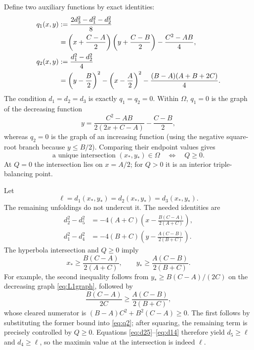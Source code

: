 \documentclass[11pt]{article}
\theoremstyle{definition}
\begin{document}
Define two auxiliary functions by exact identities:
\begin{align}
 q_1(x,y)&:=\frac{2d_3^2-d_1^2-d_2^2}{8}\notag\\
 &=\left(x+\frac{C-A}{2}\right)
   \left(y+\frac{C-B}{2}\right)-\frac{C^2-AB}{4},\label{eq:q1}\\
 q_2(x,y)&:=\frac{d_1^2-d_2^2}{4}\notag\\
 &=\left(y-\frac B2\right)^2-
   \left(x-\frac A2\right)^2-
   \frac{(B-A)(A+B+2C)}4.\label{eq:q2}
\end{align}
The condition $d_1=d_2=d_3$ is exactly $q_1=q_2=0$.
Within $\Omega$, $q_1=0$ is the graph of the decreasing function
\begin{equation}\label{eq:L1graph}
 y=\frac{C^2-AB}{2(2x+C-A)}-\frac{C-B}{2},
\end{equation}
whereas $q_2=0$ is the graph of an increasing function (using the negative
square-root branch because $y\le B/2$).  Comparing their endpoint values gives
\begin{equation}\label{eq:intersectionQ}
 \text{a unique intersection }(x_*,y_*)\in\Omega
 \quad\Longleftrightarrow\quad Q\ge0.
\end{equation}
At $Q=0$ the intersection lies on $x=A/2$; for $Q>0$ it is an interior
triple-balancing point.

Let
\begin{equation}
  \ell=d_1(x_*,y_*)=d_2(x_*,y_*)=d_3(x_*,y_*).
\end{equation}
The remaining unfoldings do not undercut it.  The needed identities are
\begin{align}
 d_2^2-d_5^2
 &=-4(A+C)\left(x-\frac{B(C-A)}{2(A+C)}\right),\label{eq:d25}\\
 d_1^2-d_4^2
 &=-4(B+C)\left(y-\frac{A(C-B)}{2(B+C)}\right).\label{eq:d14}
\end{align}
The hyperbola intersection and $Q\ge0$ imply
\begin{equation}\label{eq:xy-lower}
  x_*\ge\frac{B(C-A)}{2(A+C)},\qquad
  y_*\ge\frac{A(C-B)}{2(B+C)}.
\end{equation}
For example, the second inequality follows from
$y_*\ge B(C-A)/(2C)$ on the decreasing graph \eqref{eq:L1graph}, followed by
\[
  \frac{B(C-A)}{2C}\ge\frac{A(C-B)}{2(B+C)},
\]
whose cleared numerator is $(B-A)C^2+B^2(C-A)\ge0$.  The first follows by
substituting the former bound into \eqref{eq:q2}; after squaring, the remaining
term is precisely controlled by $Q\ge0$.  Equations \eqref{eq:d25}--\eqref{eq:d14}
therefore yield $d_5\ge\ell$ and $d_4\ge\ell$, so the maximin value at the
intersection is indeed $\ell$.
\end{document}
